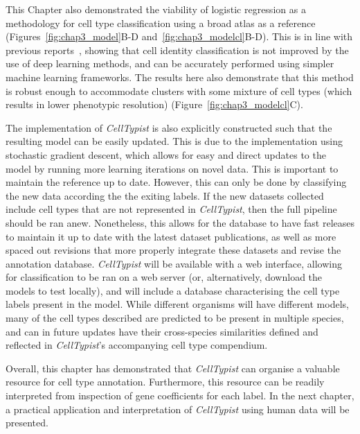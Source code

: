 This Chapter also demonstrated the viability of logistic regression as a methodology for cell type classification using a broad atlas as a reference (Figures~\ref{fig:chap3_model}B-D and~\ref{fig:chap3_modelcl}B-D). This is in line with previous reports~\citep{kohler_deep_2019,abdelaal_comparison_2019}, showing that cell identity classification is not improved by the use of deep learning methods, and can be accurately performed using simpler machine learning frameworks. The results here also demonstrate that this method is robust enough to accommodate clusters with some mixture of cell types (which results in lower phenotypic resolution) (Figure~\ref{fig:chap3_modelcl}C).

The implementation of \textit{CellTypist} is also explicitly constructed such that the resulting model can be easily updated. This is due to the implementation using stochastic gradient descent, which allows for easy and direct updates to the model by running more learning iterations on novel data. This is important to maintain the reference up to date. However, this can only be done by classifying the new data according the the exiting labels. If the new datasets collected include cell types that are not represented in \textit{CellTypist}, then the full pipeline should be ran anew. Nonetheless, this allows for the database to have fast releases to maintain it up to date with the latest dataset publications, as well as more spaced out revisions that more properly integrate these datasets and revise the annotation database. \textit{CellTypist} will be available with a web interface, allowing for classification to be ran on a web server (or, alternatively, download the models to test locally), and will include a database characterising the cell type labels present in the model. While different organisms will have different models, many of the cell types described are predicted to be present in multiple species, and can in future updates have their cross-species similarities defined and reflected in \textit{CellTypist}'s accompanying cell type compendium.

Overall, this chapter has demonstrated that \textit{CellTypist} can organise a valuable resource for cell type annotation. Furthermore, this resource can be readily interpreted from inspection of gene coefficients for each label. In the next chapter, a practical application and interpretation of \textit{CellTypist} using human data will be presented.